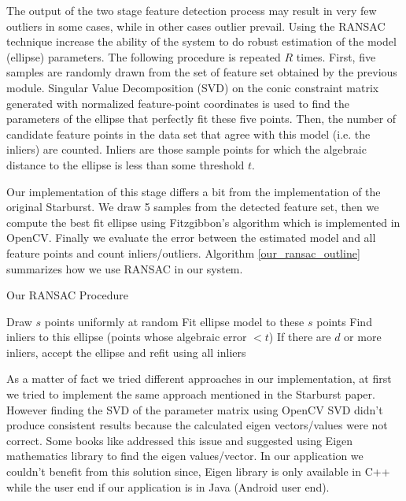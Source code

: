 \documentclass[12pt,fleqn]{book} %
\begin{document}
The output of the two stage feature detection process may result in very few outliers in some cases, while in other cases outlier prevail. Using the RANSAC technique increase the ability of the system to do robust estimation of the model (ellipse) parameters. The following procedure is repeated $R$ times. First, five samples are randomly drawn from the set of feature set obtained by the previous module.  Singular Value Decomposition (SVD) on the conic constraint matrix generated with normalized feature-point coordinates \cite{multipleViewGeom} is used to find the parameters of the ellipse that perfectly fit these five points. Then, the number of candidate feature points in the data set that agree with this model (i.e. the inliers) are counted. Inliers are those sample points for which the algebraic distance to the ellipse is less than some threshold $t$. \bigskip

Our implementation of this stage differs a bit from the implementation of the original Starburst. We draw 5 samples from the detected feature set, then we compute the best fit ellipse using Fitzgibbon's algorithm \cite{fitzgibbon96} which is implemented in OpenCV. Finally we evaluate the error between the estimated model and all feature points and count inliers/outliers. Algorithm \ref{our_ransac_outline} summarizes how we use RANSAC in our system. \bigskip

\begin{algorithm}
\begin{dBox}
	\caption{Our RANSAC Procedure} \label{our_ransac_outline}
	\begin{algorithmic}[1]
			\State Draw $s$ points uniformly at random
			\State Fit ellipse model to these $s$ points
			\State Find inliers to this ellipse (points whose algebraic error $ < t$)
			\State If there are $d$ or more inliers, accept the ellipse and refit using all inliers	
		\EndWhile	
		\EndProcedure	
	\end{algorithmic}
\end{dBox}	
\end{algorithm}


As a matter of fact we tried different approaches in our implementation, at first we tried to implement the same approach mentioned in the Starburst paper. However finding the SVD of the parameter matrix using OpenCV SVD didn't produce consistent results because the calculated eigen vectors/values were not correct. Some books like \cite{practicalOpenCV} addressed this issue and suggested using Eigen mathematics library \cite{eigenweb} to find the eigen values/vector. In our application we couldn't benefit from this solution since, Eigen library is only available in C++ while the user end if our application is in Java (Android user end).
\end{document}
